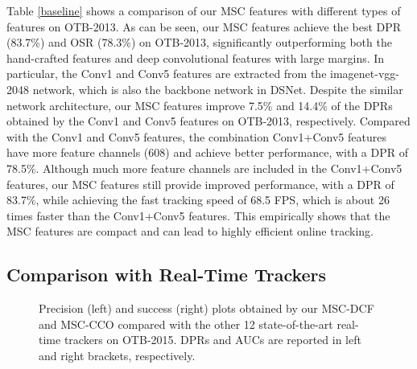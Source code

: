 \documentclass[runningheads]{llncs}
\begin{document}
Table \ref{baseline} shows a comparison of our MSC features with different types of features on OTB-2013. As can be seen, our MSC features achieve the best DPR (83.7\%) and OSR (78.3\%) on OTB-2013, significantly outperforming both the hand-crafted features and deep convolutional features with large margins. In particular, the Conv1 and Conv5 features are extracted from the imagenet-vgg-2048 network, which is also the backbone network in DSNet. Despite the similar network architecture, our MSC features improve 7.5\% and 14.4\% of the DPRs obtained by the Conv1 and Conv5 features on OTB-2013, respectively. Compared with the Conv1 and Conv5 features, the combination Conv1+Conv5 features have more feature channels (608) and achieve better performance, with a DPR of 78.5\%. Although much more feature channels are included in the Conv1+Conv5 features, our MSC features still provide improved performance, with a DPR of 83.7\%, while achieving the fast tracking speed of 68.5 FPS, which is about 26 times faster than the Conv1+Conv5 features. This empirically shows that the MSC features are compact and can lead to highly efficient online tracking.











\subsection{Comparison with Real-Time Trackers}
\begin{figure*}[!tp]
 \begin{center}
\end{center}
\vfill
   \caption{\label{overall} Precision (left) and success (right) plots obtained by our MSC-DCF and MSC-CCO compared with the other 12 state-of-the-art real-time trackers on OTB-2015. DPRs and AUCs are reported in left and right brackets, respectively.}
\end{figure*}
\end{document}
